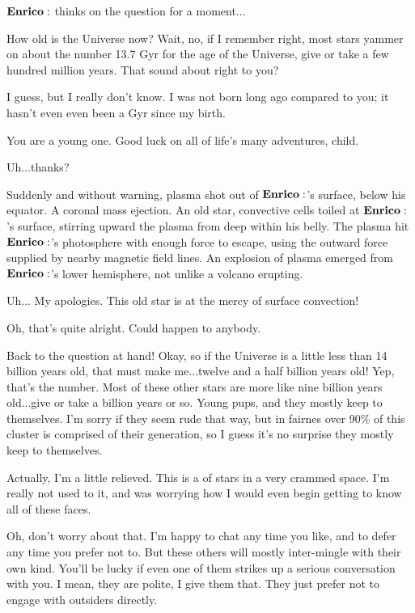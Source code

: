 \documentclass[main.tex]{subfiles}
\begin{document}
$\Enrico$ thinks on the question for a moment...

\Enrico How old is the Universe now?  Wait, no, if I remember right, most stars yammer on about the number 13.7 Gyr for the age of the Universe, give or take a few hundred million years.  That sound about right to you?

\Sterope I guess, but I really don't know.  I was not born long ago compared to you; it hasn't even even been a Gyr since my birth.

\Enrico You are a young one.  Good luck on all of life's many adventures, child.  

\Sterope Uh...thanks?

Suddenly and without warning, plasma shot out of $\Enrico$'s surface, below his equator.  A coronal mass ejection.  An old star, convective cells toiled at $\Enrico$'s surface, stirring upward the plasma from deep within his belly.  The plasma hit $\Enrico$'s photosphere with enough force to escape, using the outward force supplied by nearby magnetic field lines.  An explosion of plasma emerged from $\Enrico$'s lower hemisphere, not unlike a volcano erupting.

\Enrico Uh... My apologies.  This old star is at the mercy of surface convection!

\Sterope Oh, that's quite alright.  Could happen to anybody.

\Enrico Back to the question at hand!  Okay, so if the Universe is a little less than 14 billion years old, that must make me...twelve and a half billion years old!  Yep, that's the number.  Most of these other stars are more like nine billion years old...give or take a billion years or so.  Young pups, and they mostly keep to themselves.  I'm sorry if they seem rude that way, but in fairnes over 90\% of this cluster is comprised of their generation, so I guess it's no surprise they mostly keep to themselves.  

\Sterope Actually, I'm a little relieved.  This is a  of stars in a very crammed space.  I'm really not used to it, and was worrying how I would even begin getting to know all of these faces.

\Enrico Oh, don't worry about that.  I'm happy to chat any time you like, and to defer any time you prefer not to.  But these others will mostly inter-mingle with their own kind.  You'll be lucky if even one of them strikes up a serious conversation with you.  I mean, they are polite, I give them that.  They just prefer not to engage with outsiders directly.  
\end{document}
